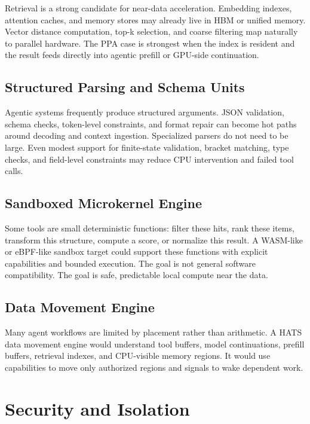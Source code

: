 \documentclass[11pt]{article}
\begin{document}
Retrieval is a strong candidate for near-data acceleration. Embedding indexes,
attention caches, and memory stores may already live in HBM or unified memory.
Vector distance computation, top-k selection, and coarse filtering map naturally
to parallel hardware. The PPA case is strongest when the index is resident and
the result feeds directly into agentic prefill or GPU-side continuation.

\subsection{Structured Parsing and Schema Units}

Agentic systems frequently produce structured arguments. JSON validation,
schema checks, token-level constraints, and format repair can become hot paths
around decoding and context ingestion. Specialized parsers do not need to be large. Even modest
support for finite-state validation, bracket matching, type checks, and
field-level constraints may reduce CPU intervention and failed tool calls.

\subsection{Sandboxed Microkernel Engine}

Some tools are small deterministic functions: filter these hits, rank these
items, transform this structure, compute a score, or normalize this result. A
WASM-like or eBPF-like sandbox target could support these functions with
explicit capabilities and bounded execution. The goal is not general software
compatibility. The goal is safe, predictable local compute near the data.

\subsection{Data Movement Engine}

Many agent workflows are limited by placement rather than arithmetic. A HATS
data movement engine would understand tool buffers, model continuations,
prefill buffers, retrieval indexes, and CPU-visible memory regions. It would use capabilities to
move only authorized regions and signals to wake dependent work.

\section{Security and Isolation}
\end{document}
